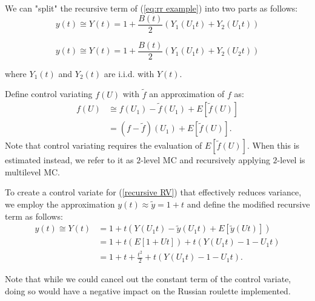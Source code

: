 \documentclass[a4paper,12pt]{article}
\begin{document}
\begin{example} \label{ex:splitting}
  We can "split" the recursive term of (\ref{eq:rr example})
  into two parts as follows:
  \begin{equation}\label{eq:splitting}
    y(t) \cong Y(t) =1 + \frac{B(t)}{2}(Y_{1}(U_{1}t) + Y_{2}(U_{1}t))
  \end{equation}


  \begin{equation}\label{eq:splitting2}
    y(t) \cong Y(t) =1 + \frac{B(t)}{2}(Y_{1}(U_{1}t) + Y_{2}(U_{2}t))
  \end{equation}


  where $Y_{1}(t)$ and $Y_{2}(t)$ are i.i.d. with $Y(t)$.
\end{example}

\begin{definition} \label{CV}
  Define control variating $f(U)$ with $\tilde{f}$ an approximation of $f$ as:
  \begin{align}
    f(U) & \cong f(U_{1})-\tilde{f}(U_{1}) + E[\tilde{f}(U)] \\
         & = (f-\tilde{f})(U_{1}) + E[\tilde{f}(U)]
    .
  \end{align}
  Note that control variating requires the evaluation of
  $E[\tilde{f}(U)]$.  When this is estimated instead, we refer to it as $2$-level MC
  and recursively applying $2$-level is multilevel MC.
\end{definition}


\begin{example} \label{ex:CV}
  To create a control variate for (\ref{recursive RV}) that
  effectively reduces variance, we employ the approximation
  $y(t) \approx \tilde{y} =1+t$ and define the modified recursive term as follows:
  \begin{align}
    y(t) \cong Y(t) & = 1 + t(Y(U_{1}t) - \tilde{y}(U_{1}t) + E[\tilde{y}(Ut)])     \\
                    & = 1 + t \left( E[1 + Ut]  \right) + t(Y(U_{1}t) - 1 - U_{1}t) \\
                    & = 1 + t + \frac{t^2}{2} + t(Y(U_{1}t) - 1 - U_{1}t).
  \end{align}


  Note that while we could cancel out the constant term
  of the control variate, doing so would have a negative impact
  on the Russian roulette implemented.
\end{example}
\end{document}
